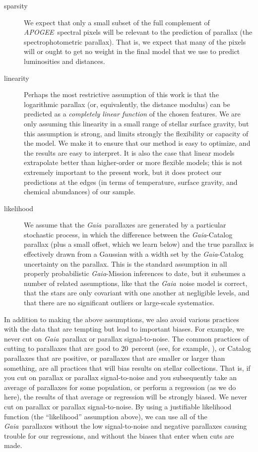 \documentclass[modern]{aastex62}
\newcommand{\acronym}[1]{{\small{#1}}}
\newcommand{\project}[1]{\textsl{#1}}
\newcommand{\apogee}{\project{\acronym{APOGEE}}}
\newcommand{\gaia}{\project{Gaia}}
\begin{document}
\begin{description}
\item[sparsity] We expect that only a small subset of the full complement of
\apogee\ spectral pixels will be relevant to the prediction of parallax
(the spectrophotometric parallax).
That is, we expect that many of the pixels will or ought to get no weight in the
final model that we use to predict luminosities and distances.

\item[linearity] Perhaps the most restrictive assumption of this work is that
the logarithmic parallax (or, equivalently, the distance modulus) 
can be predicted as a \emph{completely linear function} of
the chosen features. We are only assuming this linearity in a small range of stellar
surface gravity, but this assumption is strong, and limits strongly the
flexibility or capacity of the model.
We make it to ensure that our method is easy to optimize, and the results are easy
to interpret.
It is also the case that linear models extrapolate better than higher-order or more
flexible models; this is not extremely important to the present work, but it does
protect our predictions at the edges (in terms of temperature, surface gravity,
and chemical abundances) of our sample.

\item[likelihood] We assume that the \gaia\ parallaxes are generated by a particular
stochastic process, in which the difference between the \gaia-Catalog parallax (plus
a small offset, which we learn below) and the true parallax is effectively drawn from a
Gaussian with a width set by the \gaia-Catalog uncertainty on the parallax.
This is the standard assumption in all properly probabilistic \gaia-Mission inferences
to date, but it subsumes a number of related assumptions, like that the \gaia\ noise
model is correct, that the stars are only covariant with one another at negligible levels, and that
there are no significant outliers or large-scale systematics.
\end{description}

In addition to making the above assumptions, we also avoid various practices
with the data that are tempting but lead to important biases.
For example, we never cut on \gaia\ parallax or parallax signal-to-noise.
The common practices of cutting to parallaxes that are good to 20~percent
(see, for example, \citealt{trick, helmi}),
or Catalog parallaxes that are positive, or parallaxes that are smaller or
larger than something, are all practices that will bias results on stellar
collections.
That is, if you cut on parallax or parallax signal-to-noise and you subsequently
take an average of parallaxes for some population, or perform a regression (as we
do here), the results of that average or regression will be strongly biased.
We never cut on parallax or parallax signal-to-noise.
By using a justifiable likelihood function (the ``likelihood'' assumption above),
we can use all of the \gaia\ parallaxes without the low signal-to-noise and
negative parallaxes causing trouble for our regressions, and without the biases
that enter when cuts are made.
\end{document}
